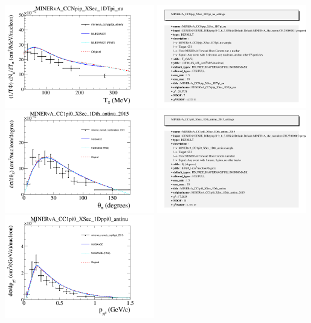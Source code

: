 \documentclass{article}
\begin{document}
\centering
\includegraphics[width=0.49\textwidth]{figures/minerva_ccnpiptpi_eberly_comp.png}
\includegraphics[width=0.49\textwidth]{figures/minerva_ccnpiptpi_eberly_info.png}
\centering
\includegraphics[width=0.49\textwidth]{figures/minerva_numub_ccpi0anglepi_2015_comp.png}
\includegraphics[width=0.49\textwidth]{figures/minerva_numub_ccpi0anglepi_2015_info.png}
\centering
\includegraphics[width=0.49\textwidth]{figures/minerva_numub_ccpi0ppi_2015_comp.png}
\end{document}
